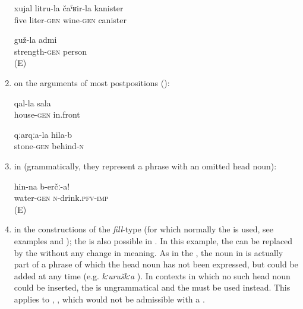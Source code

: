 \begin{enumerate}
\begin{exe}
		\ex	\label{ex:five liter canister of wine}
		\gll	xujal	litru-la		čaˁʁir-la	kanister\\
			five	liter-\textsc{gen}	wine-\textsc{gen}	canister\\
		\glt	{}

		\ex	\label{ex:strong person}
		\gll	guž-la	admi\\
			strength-\textsc{gen}	person\\
		\glt	{} (E)

	\end{exe}

	\item	on the arguments of most postpositions ():
	\begin{exe}
		\ex	\label{ex:in front of the house}
		\gll	qal-la sala\\
			house-\textsc{gen}	in.front\\
		\glt	{}

		\ex	\label{ex:behind the stone}
		\gll	qːarqːa-la	hila-b\\
			stone-\textsc{gen}	behind-\textsc{n}\\
		\glt	{}
	\end{exe}

	\item	in  (grammatically, they represent a  phrase with an omitted head noun):
	\begin{exe}
		\ex	\label{ex:Drink (some) water}
		\gll	hin-na	b-erčː-a!\\
			water-\textsc{gen}	\textsc{n}-drink.\textsc{pfv}-\textsc{imp}\\
		\glt	\sqt{Drink (some) water!} (E)
	\end{exe}

\item	in the constructions of the \textit{fill}-type (for which normally the  is used, see examples  and ); the  is also possible in . In this example, the  can be replaced by the  without any change in meaning. As in the , the  noun in  is actually part of a  phrase of which the head noun has not been expressed, but could be added at any time (e.g. \textit{kːuruškːa} ). In contexts in which no such head noun could be inserted, the  is ungrammatical and the  must be used instead. This applies to , , which would not be admissible with a .


\end{enumerate}
